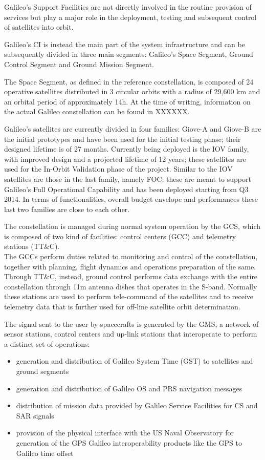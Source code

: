 Galileo's Support Facilities are not directly involved in the routine provision
of services but play a major role in the deployment, testing and subsequent
control of satellites into orbit.

Galileo's CI is instead the main part of the system infrastructure and can be
subsequently divided in three main segments: Galileo's Space Segment, Ground
Control Segment and Ground Mission Segment.

The Space Segment, as defined in the reference constellation, is composed of 24
operative satellites distributed in 3 circular orbits with a radius of 29,600 km
and an orbital period of approximately 14h. At the time of writing, information
on the actual Galileo constellation can be found in XXXXXX.

Galileo's satellites are currently divided in four families: Giove-A and Giove-B
are the initial prototypes and have been used for the initial testing phase;
their designed lifetime is of 27 months. Currently being deployed is the IOV
family, with improved design and a projected lifetime of 12 years; these
satellites are used for the In-Orbit Validation phase of the project. Similar to
the IOV satellites are those in the last family, namely FOC; these are meant to
support Galileo's Full Operational Capability and has been deployed starting
from Q3 2014. In terms of functionalities, overall budget envelope and
performances these last two families are close to each other.

The constellation is managed during normal system operation by the GCS, which is
composed of two kind of facilities: control centers (GCC) and telemetry stations
(TT\&C). \\
The GCCs perform duties related to monitoring and control of the
constellation, together with planning, flight dynamics and operations
preparation of the same.\\
Through TT\&C, instead, ground control performs data exchange with the entire
constellation through 11m antenna dishes that operates in the S-band. Normally
these stations are used to perform tele-command of the satellites and to receive
telemetry data that is further used for off-line satellite orbit determination.

The signal sent to the user by spacecrafts is generated by the GMS, a network of
sensor stations, control centers and up-link stations that interoperate to
perform a distinct set of operations:
\begin{itemize}
  \item generation and distribution of Galileo System Time (GST) to satellites
    and ground segments
  \item generation and distribution of Galileo OS and PRS navigation messages
  \item distribution of mission data provided by Galileo Service Facilities for
    CS and SAR signals
  \item provision of the physical interface with the US Naval Observatory for
    generation of the GPS Galileo interoperability products like the GPS to
    Galileo time offset
\end{itemize}

